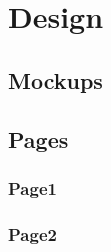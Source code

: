 \Author{\daAuthorOne}

\section{Design}

\subsection{Mockups}

\subsection{Pages}

\subsubsection{Page1}

\subsubsection{Page2}


